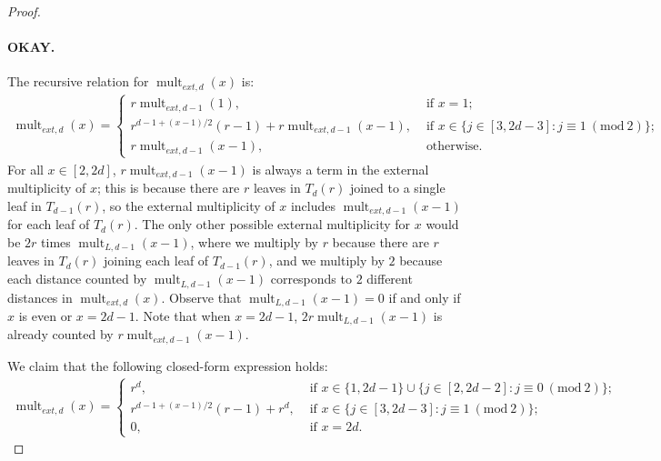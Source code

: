 \documentclass[12]{article}
\newcommand{\Mod}[1]{\ (\mathrm{mod}\ #1)}
\DeclareMathOperator{\mult}{mult}
\theoremstyle{definition}
\begin{document}
\begin{proof}
\paragraph{OKAY.}  The recursive relation for $\mult_{ext,d}(x)$ is:
\begin{align*}
	\mult_{ext,d}(x) = \begin{cases}
		r\mult_{ext,d-1}(1),	&\text{ if } x = 1; 	\\
		r^{d-1+(x-1)/2}(r-1) + r\mult_{ext,d-1}(x-1),	&\text{ if } x \in \{j \in [3,2d-3]: j \equiv 1 \Mod{2}\};	\\
		r\mult_{ext,d-1}(x-1),	&\text{ otherwise. }
	\end{cases}
\end{align*}
	For all $x \in [2,2d]$, $r\mult_{ext,d-1}(x-1)$ is always a term in the external multiplicity of $x$; this is because there are $r$ leaves in $T_{d}(r)$ joined to a single leaf in $T_{d-1}(r)$, so the external multiplicity of $x$ includes $\mult_{ext,d-1}(x-1)$ for each leaf of $T_{d}(r)$.  The only other possible external multiplicity for $x$ would be $2r$ times $\mult_{L,d-1}(x-1)$, where we multiply by $r$ because there are $r$ leaves in $T_{d}(r)$ joining each leaf of $T_{d-1}(r)$, and we multiply by $2$ because each distance counted by $\mult_{L,d-1}(x-1)$ corresponds to $2$ different distances in $\mult_{ext,d}(x)$.  Observe that $\mult_{L,d-1}(x-1) = 0$ if and only if $x$ is even or $x = 2d-1$.  Note that when $x=2d-1$, $2r\mult_{L,d-1}(x-1)$ is already counted by $r\mult_{ext,d-1}(x-1)$.
	
	We claim that the following closed-form expression holds:
	\begin{align*}
		\mult_{ext,d}(x) = \begin{cases}
			r^d, 	&\text{ if } x \in \{1,2d-1\} \cup \{j \in [2,2d-2]: j \equiv 0 \Mod{2}\};	\\
			r^{d-1+(x-1)/2}(r-1) + r^d, 	&\text{ if } x \in \{j \in [3,2d-3]: j \equiv 1 \Mod{2}\};	\\
			0,	&\text{ if } x = 2d.
		\end{cases}
	\end{align*}
	

\end{proof}
\end{document}
